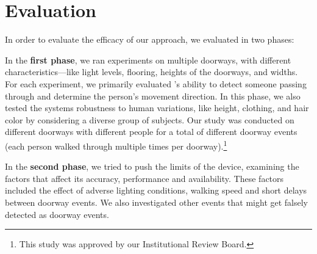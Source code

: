 \section{Evaluation}
\label{sec:evaluation}
In order to evaluate the efficacy of our approach, we evaluated \sysname in two phases:

In the \textbf{first phase}, we ran experiments on multiple doorways, with different characteristics---like light levels, flooring, heights of the doorways, and widths.
For each experiment, we primarily evaluated \sysname's ability to detect someone passing through and determine the person's movement direction.
In this phase, we also tested the systems robustness to human variations, like height, clothing, and hair color by considering a diverse group of subjects.
Our study was conducted on \numDoors different doorways with \numPeople different people for a total of \numExp different doorway events (each person walked through multiple times per doorway).\footnote{This study was approved by our Institutional Review Board.}

In the \textbf{second phase}, we tried to push the limits of the device, examining the factors that affect its accuracy, performance and availability.
These factors included the effect of adverse lighting conditions, walking speed and short delays between doorway events.
We also investigated other events that might get falsely detected as doorway events.

